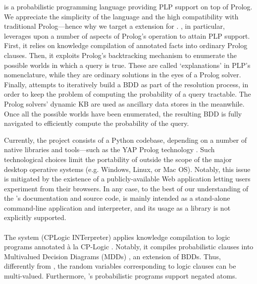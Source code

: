 \documentclass[12pt,a4paper,openright,twoside]{book}
\begin{document}
\problog{} \cite{de-raedt-2007} is a probabilistic programming language providing PLP support on top of Prolog.
%
We appreciate the simplicity of the language and the high compatibility with traditional Prolog---hence why we target a \problog{} extension for \twopkt{}.
%
\problog{}, in particular, leverages upon a number of aspects of Prolog's operation to attain PLP support.
%
First, it relies on knowledge compilation of annotated facts into ordinary Prolog clauses.
%
Then, it exploits Prolog's backtracking mechanism to enumerate the possible worlds in which a query is true.
%
These are called `explanations' in PLP's nomenclature, while they are ordinary solutions in the eyes of a Prolog solver.
%
Finally, \problog{} attempts to iteratively build a BDD as part of the resolution process, in order to keep the problem of computing the probability of a query tractable.
%
The Prolog solvers' dynamic KB are used as ancillary data stores in the meanwhile.
%
Once all the possible worlds have been enumerated, the resulting BDD is fully navigated to efficiently compute the probability of the query.

Currently, the \problog{} project consists of a Python codebase, depending on a number of native libraries and tools---such as the YAP Prolog technology \cite{CostaRD12}.
%
Such technological choices limit the portability of \problog{} outside the scope of the major desktop operative systems (e.g. Windows, Linux, or Mac OS).
%
Notably, this issue is mitigated by the existence of a publicly-available Web application letting users experiment \problog{} from their browsers.
%
In any case, to the best of our understanding of the \problog{}'s documentation and source code, \problog{} is mainly intended as a stand-alone command-line application and interpreter, and its usage as a library is not explicitly supported.

\paragraph{\cplint{}}

The \cplint{} system (CPLogic INTerpreter) \cite{riguzzi-2007} applies knowledge compilation to logic programs annotated à la CP-Logic \cite{VennekensDB09}.
%
Notably, it compiles probabilistic clauses into Multivalued Decision Diagrams (MDDs) \cite{ThayseDD78}, an extension of BDDs.
%
Thus, differently from \problog{}, the random variables corresponding to logic clauses can be multi-valued.
%
Furthermore, \cplint{}'s probabilistic programs support negated atoms.
\end{document}
